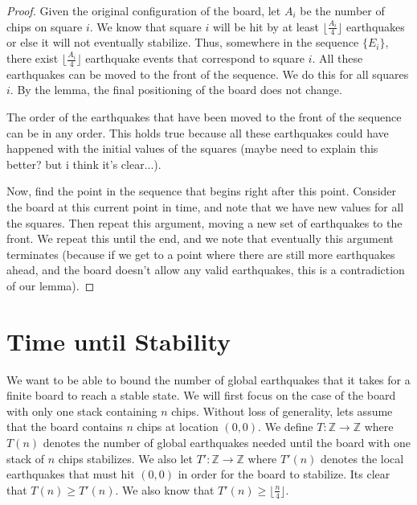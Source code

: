 \documentclass[runningheads,a4paper]{llncs}
\begin{document}
\begin{proof}
Given the original configuration of the board, let $A_i$ be the number of chips on square $i$. We know that square $i$ will be hit by at least $\lfloor \frac{A_i}{4} \rfloor$ earthquakes or else it will not eventually stabilize. Thus, somewhere in the sequence $\{E_i\}$, there exist $\lfloor \frac{A_i}{4} \rfloor$ earthquake events that correspond to square $i$. All these earthquakes can be moved to the front of the sequence. We do this for all squares $i$. By the lemma, the final positioning of the board does not change.

The order of the earthquakes that have been moved to the front of the sequence can be in any order. This holds true because all these earthquakes could have happened with the initial values of the squares (maybe need to explain this better? but i think it's clear...).

Now, find the point in the sequence that begins right after this point. Consider the board at this current point in time, and note that we have new values for all the squares. Then repeat this argument, moving a new set of earthquakes to the front. We repeat this until the end, and we note that eventually this argument terminates (because if we get to a point where there are still more earthquakes ahead, and the board doesn't allow any valid earthquakes, this is a contradiction of our lemma).

\end{proof}

\section{Time until Stability}
\label{Time until Stability}

We want to be able to bound the number of global earthquakes that it takes for a finite board to reach a stable state. We will first focus on the case of the board with only one stack containing $n$ chips. Without loss of generality, lets assume that the board contains $n$ chips at location $(0,0)$. We define $T: \mathbb{Z} \rightarrow \mathbb{Z}$ where $T(n)$ denotes the number of global earthquakes needed until the board with one stack of $n$ chips stabilizes. We also let $T':\mathbb{Z} \rightarrow \mathbb{Z}$ where $T'(n)$ denotes the local earthquakes that must hit $(0,0)$ in order for the board to stabilize. Its clear that $T(n) \geq T'(n)$. We also know that $T'(n) \geq \lfloor \frac{n}{4}\rfloor$. 
\end{document}
